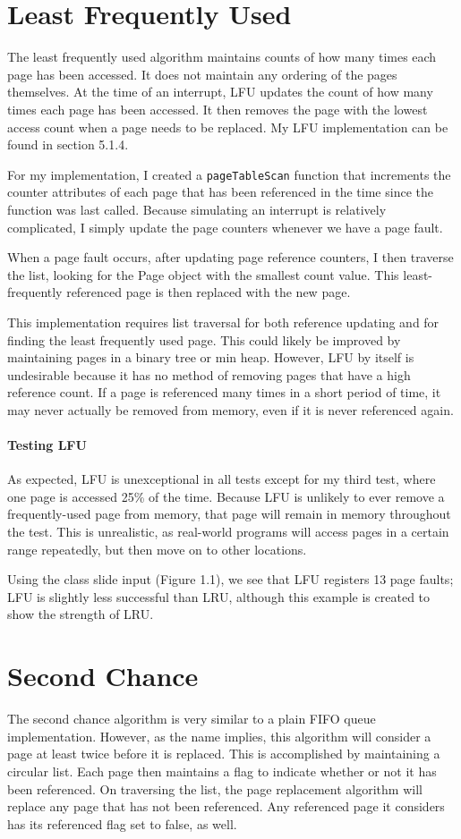 \documentclass[paper=a4, fontsize=11pt]{scrartcl} %
\numberwithin{equation}{section} %
\numberwithin{figure}{section} %
\numberwithin{table}{section} %
\begin{document}
\section{Least Frequently Used}
The least frequently used algorithm maintains counts of how many times each page has been accessed. It does not maintain any ordering of the pages themselves. At the time of an interrupt, LFU updates the count of how many times each page has been accessed. It then removes the page with the lowest access count when a page needs to be replaced. My LFU implementation can be found in section 5.1.4. 

For my implementation, I created a \texttt{pageTableScan} function that increments the counter attributes of each page that has been referenced in the time since the function was last called. Because simulating an interrupt is relatively complicated, I simply update the page counters whenever we have a page fault.

When a page fault occurs, after updating page reference counters, I then traverse the list, looking for the Page object with the smallest count value. This least-frequently referenced page is then replaced with the new page.

This implementation requires list traversal for both reference updating and for finding the least frequently used page. This could likely be improved by maintaining pages in a binary tree or min heap. However, LFU by itself is undesirable because it has no method of removing pages that have a high reference count. If a page is referenced many times in a short period of time, it may never actually be removed from memory, even if it is never referenced again.

\paragraph{Testing LFU}
As expected, LFU is unexceptional in all tests except for my third test, where one page is accessed 25\% of the time. Because LFU is unlikely to ever remove a frequently-used page from memory, that page will remain in memory throughout the test. This is unrealistic, as real-world programs will access pages in a certain range repeatedly, but then move on to other locations.

Using the class slide input (Figure 1.1), we see that LFU registers 13 page faults; LFU is slightly less successful than LRU, although this example is created to show the strength of LRU.

\section{Second Chance}
The second chance algorithm is very similar to a plain FIFO queue implementation. However, as the name implies, this algorithm will consider a page at least twice before it is replaced. This is accomplished by maintaining a circular list. Each page then maintains a flag to indicate whether or not it has been referenced. On traversing the list, the page replacement algorithm will replace any page that has not been referenced. Any referenced page it considers has its referenced flag set to false, as well.
\end{document}
